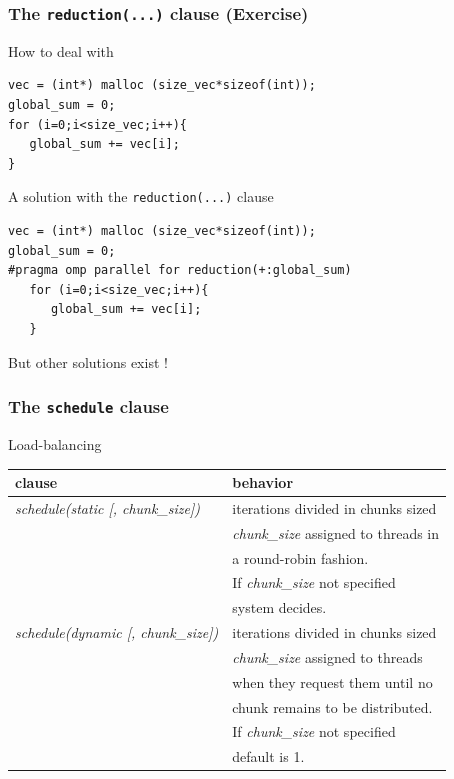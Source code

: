 \begin{frame}[containsverbatim]
\frametitle{The \texttt{reduction(...)} clause (Exercise)}
\begin{block}{How to deal with}
\vspace{-.5cm}
\begin{verbatim}
vec = (int*) malloc (size_vec*sizeof(int));
global_sum = 0;
for (i=0;i<size_vec;i++){
   global_sum += vec[i];
}
\end{verbatim}
\end{block}

\vspace{-.5cm}
\begin{block}{A solution with the \texttt{reduction(...)} clause}
\vspace{-.5cm}

\begin{verbatim}
vec = (int*) malloc (size_vec*sizeof(int));
global_sum = 0;
#pragma omp parallel for reduction(+:global_sum)
   for (i=0;i<size_vec;i++){
      global_sum += vec[i];
   }
\end{verbatim}
But other solutions exist !
\end{block}
\end{frame}


\begin{frame}[containsverbatim]
\frametitle{The \texttt{schedule} clause}

\begin{block}{}
Load-balancing
\end{block}

\begin{center}
\begin{tabular}{|l|l|}
\hline
  \textbf{clause} & \textbf{behavior}  \\
\hline
\hline
\textit{schedule(static [, chunk\_size])} &
iterations divided in chunks sized \\
& \textit{chunk\_size} assigned to threads in \\
& a round-robin fashion.  \\
& If \textit{chunk\_size} not specified \\
& system decides. \\
\hline

\textit{schedule(dynamic [, chunk\_size])} &
iterations divided in chunks sized \\
& \textit{chunk\_size} assigned to threads \\
& when they request them until no \\
& chunk remains to be distributed. \\
& If \textit{chunk\_size} not specified \\
& default is 1. \\

\hline
\end{tabular}
\end{center}

\end{frame}


